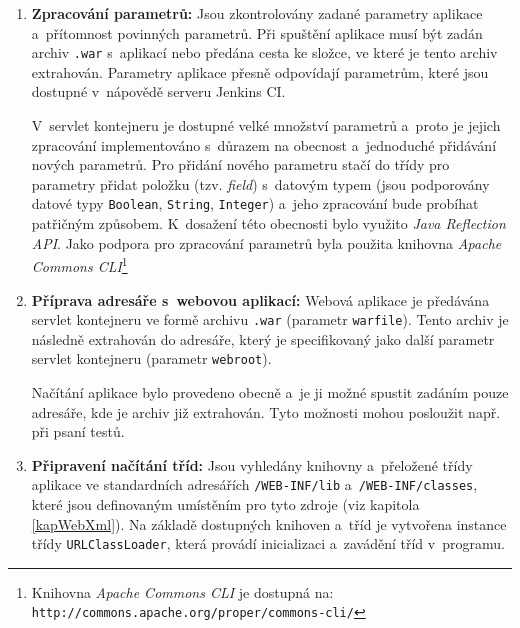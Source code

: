             \begin{enumerate}
                \item \textbf{Zpracování parametrů:} Jsou zkontrolovány zadané parametry
                    aplikace a~přítomnost povinných parametrů. Při spuštění aplikace
                    musí být zadán archiv \texttt{.war} s~aplikací nebo předána cesta
                    ke složce, ve které je tento archiv extrahován. 
                    Parametry aplikace
                    přesně odpovídají parametrům, které jsou dostupné v~nápovědě 
                    serveru Jenkins CI. 
                    
                    V~servlet kontejneru je dostupné velké množství parametrů
                    a~proto je jejich zpracování implementováno s~důrazem na obecnost a~jednoduché
                    přidávání nových parametrů. 
                    Pro přidání nového parametru stačí do třídy pro parametry přidat položku (tzv. \emph{field})
                    s~datovým typem (jsou podporovány datové typy \texttt{Boolean}, \texttt{String}, 
                    \texttt{Integer}) a~jeho zpracování bude probíhat patřičným
                    způsobem. K~dosažení této obecnosti bylo využito \emph{Java Reflection API}.
                    Jako podpora pro zpracování parametrů byla použita knihovna \emph{Apache
                    Commons CLI}\footnote{Knihovna \emph{Apache Commons CLI} je 
                    dostupná na: \texttt{http://commons.apache.org/proper/commons-cli/}}
                    
                \item \textbf{Příprava adresáře s~webovou aplikací:}  Webová aplikace
                    je předávána servlet kontejneru ve formě 
                    archivu \texttt{.war} (parametr \texttt{warfile}). Tento archiv je následně extrahován do 
                    adresáře, který je specifikovaný jako další parametr servlet kontejneru (parametr \texttt{webroot}).
                    
                    Načítání aplikace bylo provedeno obecně a~je ji možné spustit zadáním
                    pouze adresáře, kde je archiv již extrahován. Tyto možnosti mohou posloužit
                    např. při psaní testů.

                \item \textbf{Připravení načítání tříd:} Jsou vyhledány knihovny 
                    a~přeložené třídy aplikace ve standardních adresářích 
                    \texttt{/WEB-INF/lib} a~\texttt{/WEB-INF/classes}, které jsou definovaným
                    umístěním pro tyto zdroje (viz kapitola \ref{kapWebXml}). 
                    Na základě dostupných knihoven a~tříd je vytvořena instance třídy \texttt{URLClassLoader},
                    která provádí inicializaci a~zavádění tříd v~programu. 
                    

\end{enumerate}
